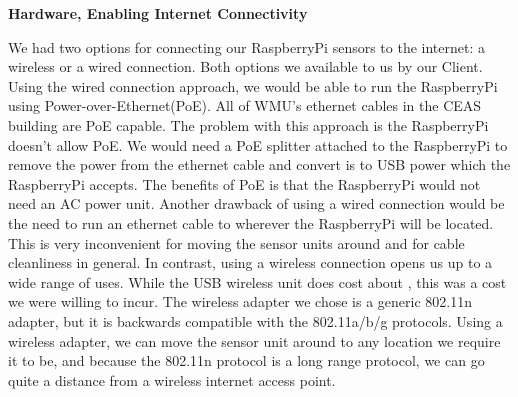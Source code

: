 \documentclass{report}
\begin{document}
\begin{center}
	\textbf{Hardware, Enabling Internet Connectivity}
\end{center}
\indent
\indent
We had two options for connecting our RaspberryPi sensors to the internet: a wireless or a wired connection. Both options we available to us by our Client.
\newline
\indent
Using the wired connection approach, we would be able to run the RaspberryPi using Power-over-Ethernet(PoE). All of WMU's ethernet cables in the CEAS building are PoE capable. The problem with this approach is the RaspberryPi doesn't allow PoE. We would need a PoE splitter attached to the RaspberryPi to remove the power from the ethernet cable and convert is to USB power which the RaspberryPi accepts. The benefits of PoE is that the RaspberryPi would not need an AC power unit.
\newline
\indent
Another drawback of using a wired connection would be the need to run an ethernet cable to wherever the RaspberryPi will be located. This is very inconvenient for moving the sensor units around and for cable cleanliness in general.
\newline
\indent
In contrast, using a wireless connection opens us up to a wide range of uses. While the USB wireless unit does cost about , this was a cost we were willing to incur. The wireless adapter we chose is a generic 802.11n adapter, but it is backwards compatible with the 802.11a/b/g protocols. Using a wireless adapter, we can move the sensor unit around to any location we require it to be, and because the 802.11n protocol is a long range protocol, we can go quite a distance from a wireless internet access point.
\newpage
\end{document}
